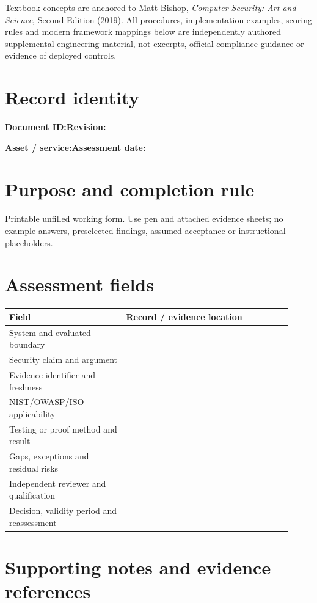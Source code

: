 \documentclass[10pt,letterpaper]{article}
\begin{document}
\makedoctocpage
\begin{notebox}
Textbook concepts are anchored to Matt Bishop, \emph{Computer Security: Art and Science}, Second Edition (2019). All procedures, implementation examples, scoring rules and modern framework mappings below are independently authored supplemental engineering material, not excerpts, official compliance guidance or evidence of deployed controls.
\end{notebox}
\section{Record identity}
\textbf{Document ID:}\enspace\hrulefill\quad\textbf{Revision:}\enspace\hrulefill
\par\medskip\textbf{Asset / service:}\enspace\hrulefill\quad\textbf{Assessment date:}\enspace\hrulefill
\section{Purpose and completion rule}
Printable unfilled working form. Use pen and attached evidence sheets; no example answers, preselected findings, assumed acceptance or instructional placeholders.
\section{Assessment fields}
\renewcommand{\arraystretch}{1.8}
\begin{longtable}{@{}p{0.38\linewidth}p{0.54\linewidth}@{}}
\toprule\textbf{Field}&\textbf{Record / evidence location}\\\midrule\endhead
System and evaluated boundary & \rule{0pt}{1.3cm}\\\midrule
Security claim and argument & \rule{0pt}{1.3cm}\\\midrule
Evidence identifier and freshness & \rule{0pt}{1.3cm}\\\midrule
NIST/OWASP/ISO applicability & \rule{0pt}{1.3cm}\\\midrule
Testing or proof method and result & \rule{0pt}{1.3cm}\\\midrule
Gaps, exceptions and residual risks & \rule{0pt}{1.3cm}\\\midrule
Independent reviewer and qualification & \rule{0pt}{1.3cm}\\\midrule
Decision, validity period and reassessment & \rule{0pt}{1.3cm}\\\midrule
\bottomrule\end{longtable}
\section{Supporting notes and evidence references}
\end{document}
